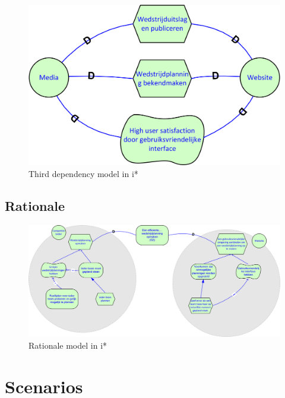\documentclass[12pt,a4paper]{article}
\begin{document}
			\begin{figure}[H]
				\includegraphics[width=\textwidth]{../2-Doelen/istar3.png}
				\caption{Third dependency model in i*}
			\end{figure}
			\subsection{Rationale}
			\begin{figure}[H]
				\includegraphics[width=\textwidth]{../2-Doelen/istar4.png}
				\caption{Rationale model in i*}
			\end{figure}
		\section{Scenarios}
\end{document}
